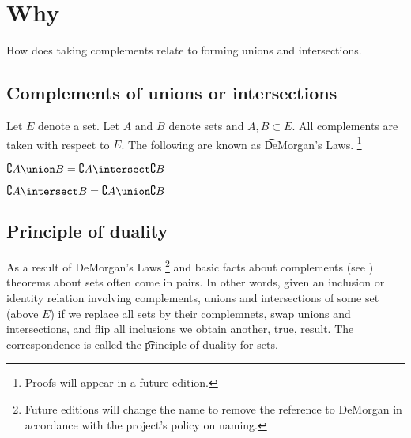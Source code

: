 
\section*{Why}

How does taking complements relate to forming unions and intersections.

\subsection*{Complements of unions or intersections}

Let $E$ denote a set.
Let $A$ and $B$ denote sets and $A, B \subset E$.
All complements are taken with respect to $E$.
The following are known as \t{DeMorgan's Laws}.
  \ifhmode\unskip\fi\footnote{
Proofs will appear in a future edition.
  }

\begin{proposition}$\complement{A \union B} = \complement{A} \intersect \complement{B}$\end{proposition}
\begin{proposition}$\complement{A \intersect B} = \complement{A} \union \complement{B}$\end{proposition}
\subsection*{Principle of duality}

As a result of DeMorgan's Laws
  \ifhmode\unskip\fi\footnote{
Future editions will change the name to remove the reference to DeMorgan in accordance with the project's policy on naming.
  }
and basic facts about complements (see ) theorems about sets often come in pairs.
In other words, given an inclusion or identity relation involving complements, unions and intersections of some set (above $E$) if we replace all sets by their complemnets, swap unions and intersections, and flip all inclusions we obtain another, true, result.
The correspondence is called the \t{principle of duality for sets}.

\blankpage